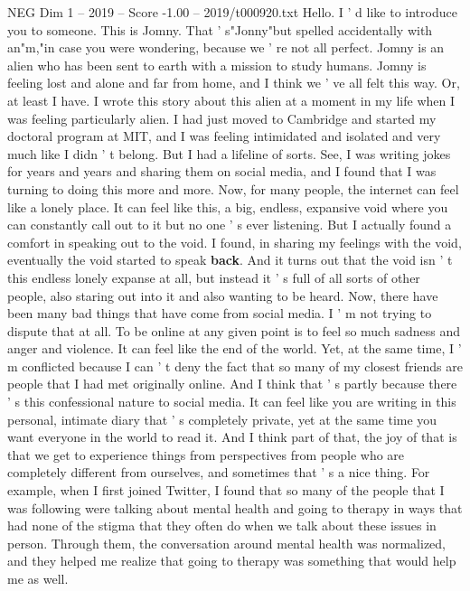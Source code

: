 \begin{textsample}{NEG Dim 1 – 2019 – Score -1.00 – 2019/t000920.txt}  \label{ex:f1_neg_023}
Hello.
I ' d like to introduce you to someone.
This is Jomny.
That ' s"Jonny"but spelled accidentally with an"m,"in case you were wondering, because we ' re not all perfect.
Jomny is an alien who has been sent to earth with a mission to study humans.
Jomny is feeling lost and alone and far from home, and I think we ' ve all felt this way.
Or, at least I have.
I wrote this story about this alien at a moment in my life when I was feeling particularly alien.
I had just moved to Cambridge and started my doctoral program at MIT, and I was feeling intimidated and isolated and very much like I didn ' t belong.
But I had a lifeline of sorts.
See, I was writing jokes for years and years and sharing them on social media, and I found that I was turning to doing this more and more.
Now, for many people, the internet can feel like a lonely place.
It can feel like this, a big, endless, expansive void where you can constantly call out to it but no one ' s ever listening.
But I actually found a comfort in speaking out to the void.
I found, in sharing my feelings with the void, eventually the void started to speak \textbf{back}.
And it turns out that the void isn ' t this endless lonely expanse at all, but instead it ' s full of all sorts of other people, also staring out into it and also wanting to be heard.
Now, there have been many bad things that have come from social media.
I ' m not trying to dispute that at all.
To be online at any given point is to feel so much sadness and anger and violence.
It can feel like the end of the world.
Yet, at the same time, I ' m conflicted because I can ' t deny the fact that so many of my closest friends are people that I had met originally online.
And I think that ' s partly because there ' s this confessional nature to social media.
It can feel like you are writing in this personal, intimate diary that ' s completely private, yet at the same time you want everyone in the world to read it.
And I think part of that, the joy of that is that we get to experience things from perspectives from people who are completely different from ourselves, and sometimes that ' s a nice thing.
For example, when I first joined Twitter, I found that so many of the people that I was following were talking about mental health and going to therapy in ways that had none of the stigma that they often do when we talk about these issues in person.
Through them, the conversation around mental health was normalized, and they helped me realize that going to therapy was something that would help me as well.

\end{textsample}
